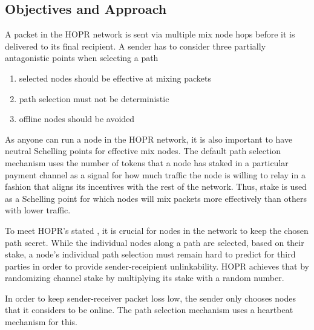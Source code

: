 \subsection{Objectives and Approach}
A packet in the HOPR network is sent via multiple mix node hops before it is delivered to its final recipient. A sender has to consider three partially antagonistic points when selecting a path

\begin{enumerate}
    \item selected nodes should be effective at mixing packets
    \item path selection must not be deterministic
    \item offline nodes should be avoided
\end{enumerate}

As anyone can run a node in the HOPR network, it is also important to have neutral Schelling points for effective mix nodes. The default path selection mechanism uses the number of tokens that a node has staked in a particular payment channel as a signal for how much traffic the node is willing to relay in a fashion that aligns its incentives with the rest of the network. Thus, stake is used as a Schelling point for which nodes will mix packets more effectively than others with lower traffic.

To meet HOPR's stated , it is crucial for nodes in the network to keep the chosen path secret. While the individual nodes along a path are selected, based on their stake, a node's individual path selection must remain hard to predict for third parties in order to provide sender-receipient unlinkability. HOPR achieves that by randomizing channel stake by multiplying its stake with a random number.

In order to keep sender-receiver packet loss low, the sender only chooses nodes that it considers to be online. The path selection mechanism uses a heartbeat mechanism for this.